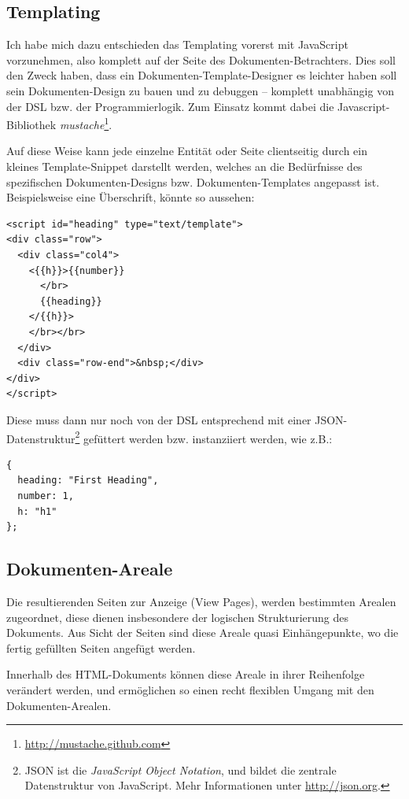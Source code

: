 \subsection{Templating}\label{sec-templating}

Ich habe mich dazu entschieden das Templating vorerst mit JavaScript
vorzunehmen, also komplett auf der Seite des Dokumenten-Betrachters.
Dies soll den Zweck haben, dass ein Dokumenten-Template-Designer es
leichter haben soll sein Dokumenten-Design zu bauen und zu debuggen --
komplett unabhängig von der DSL bzw. der Programmierlogik.
Zum Einsatz kommt dabei die Javascript-Bib\-lio\-thek
\emph{mustache}\footnote{\url{http://mustache.github.com}}.

Auf diese Weise kann jede einzelne Entität oder Seite clientseitig
durch ein kleines Template-Snippet darstellt werden, welches an die
Bedürfnisse des spezifischen Dokumenten-Designs bzw. Dokumenten-Templates
angepasst ist. Beispielsweise eine Überschrift, könnte so aussehen:

\begin{verbatim}
<script id="heading" type="text/template">
<div class="row">
  <div class="col4">
    <{{h}}>{{number}}
      </br>
      {{heading}}
    </{{h}}>
    </br></br>
  </div>
  <div class="row-end">&nbsp;</div>
</div>
</script>
\end{verbatim}

Diese muss dann nur noch von der DSL entsprechend mit einer
JSON-Daten\-struktur\footnote{JSON ist die \emph{JavaScript Object Notation},
und bildet die zentrale Datenstruktur von JavaScript.
Mehr Informationen unter \url{http://json.org}.} gefüttert werden bzw.
instanziiert werden, wie z.B.:

\begin{verbatim}
{
  heading: "First Heading",
  number: 1,
  h: "h1"
};
\end{verbatim}

\subsection{Dokumenten-Areale}\label{sec-areal}

Die resultierenden Seiten zur Anzeige (View Pages), werden bestimmten
Arealen zugeordnet, diese dienen insbesondere der logischen Strukturierung
des Dokuments. Aus Sicht der Seiten sind diese Areale quasi
Einhängepunkte, wo die fertig gefüllten Seiten angefügt werden.

Innerhalb des HTML-Dokuments können diese Areale in ihrer Reihenfolge
verändert werden, und ermöglichen so einen recht flexiblen Umgang mit
den Doku\-men\-ten-Arealen.

